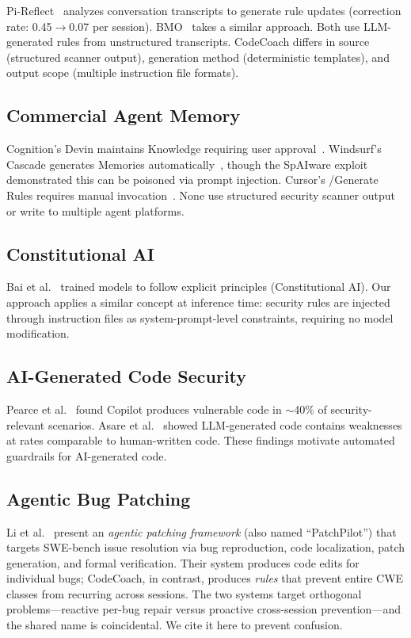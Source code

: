 \documentclass[conference,10pt]{IEEEtran}
\begin{document}
Pi-Reflect~\cite{pi-reflect} analyzes conversation transcripts to generate rule updates (correction rate: 0.45$\rightarrow$0.07 per session). BMO~\cite{bmo} takes a similar approach. Both use LLM-generated rules from unstructured transcripts. CodeCoach differs in source (structured scanner output), generation method (deterministic templates), and output scope (multiple instruction file formats).

\subsection{Commercial Agent Memory}

Cognition's Devin maintains Knowledge requiring user approval~\cite{devin}. Windsurf's Cascade generates Memories automatically~\cite{windsurf}, though the SpAIware exploit~\cite{spaiware} demonstrated this can be poisoned via prompt injection. Cursor's /Generate Rules requires manual invocation~\cite{cursor-rules}. None use structured security scanner output or write to multiple agent platforms.

\subsection{Constitutional AI}

Bai et al.~\cite{constitutional-ai} trained models to follow explicit principles (Constitutional AI). Our approach applies a similar concept at inference time: security rules are injected through instruction files as system-prompt-level constraints, requiring no model modification.

\subsection{AI-Generated Code Security}

Pearce et al.~\cite{pearce-copilot} found Copilot produces vulnerable code in $\sim$40\% of security-relevant scenarios. Asare et al.~\cite{asare-copilot} showed LLM-generated code contains weaknesses at rates comparable to human-written code. These findings motivate automated guardrails for AI-generated code.

\subsection{Agentic Bug Patching}

Li et al.~\cite{ucsb-patchpilot} present an \textit{agentic patching framework} (also named ``PatchPilot'') that targets SWE-bench issue resolution via bug reproduction, code localization, patch generation, and formal verification. Their system produces code edits for individual bugs; CodeCoach, in contrast, produces \textit{rules} that prevent entire CWE classes from recurring across sessions. The two systems target orthogonal problems---reactive per-bug repair versus proactive cross-session prevention---and the shared name is coincidental. We cite it here to prevent confusion.
\end{document}
